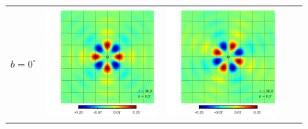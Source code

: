 \documentclass[a4paper,11pt]{article}
\begin{document}
\begin{figure}[!t]
\begin{center}
\begin{tabular}{m{8ex}m{}m{}|m{}m{}}
$b=0^\circ$&
\hspace{\kernelfigspace}\includegraphics[width=\kernelfigwidth]{qu2ebqu_rker_D_lat0_lon90.pdf} &
\hspace{\kernelfigspace}\includegraphics[width=\kernelfigwidth]{qu2ebqu_iker_D_lat0_lon90.pdf} &

\end{tabular}
\end{center}
\end{figure}
\end{document}
